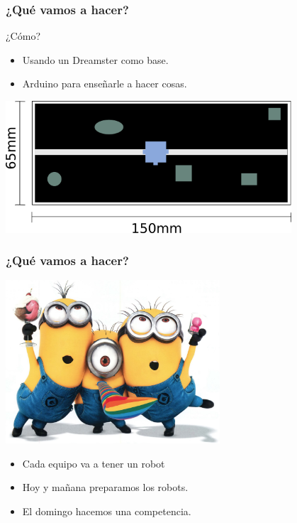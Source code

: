 \documentclass[compress]{beamer}
\begin{document}
\begin{frame}
 \frametitle{¿Qué vamos a hacer?}

\begin{center}
\end{center}

\begin{block}{¿Cómo?}
\begin{itemize}
 \item Usando un Dreamster como base.
 \item Arduino para enseñarle a hacer cosas.
\end{itemize}
\end{block}

\begin{center}
\includegraphics[width=0.8\textwidth]{./img/desk.png} 
\end{center}

\end{frame}
 
\begin{frame}
\begin{center}
\frametitle{¿Qué vamos a hacer?}
\includegraphics[width=0.6\textwidth]{./img/equipo.jpg}

\end{center}
\begin{itemize}
 \item Cada equipo va a tener un robot
 \item Hoy y mañana preparamos los robots.
 \item El domingo hacemos una competencia.
\end{itemize}

\end{frame}
\end{document}

